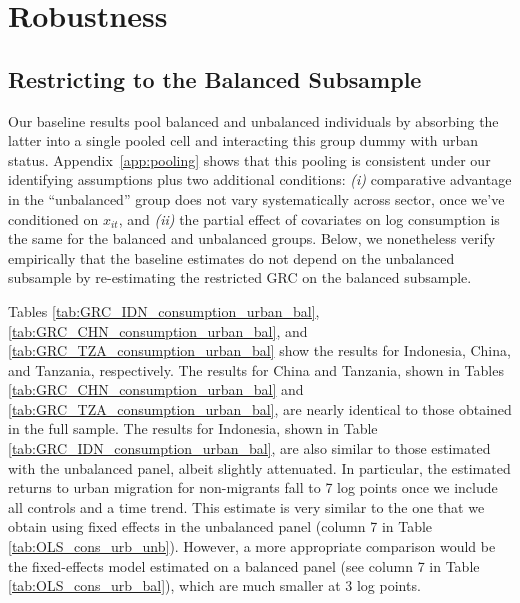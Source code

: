 \section{Robustness}\label{sec:robustness}

\subsection{Restricting to the Balanced Subsample}\label{subsec:balanced}

Our baseline results pool balanced and unbalanced individuals by absorbing the latter into a single pooled cell and interacting this group dummy with urban status.
Appendix~\ref{app:pooling} shows that this pooling is consistent under our identifying assumptions plus two additional conditions: \textit{(i)} comparative advantage in the ``unbalanced'' group does not vary systematically across sector, once we've conditioned on $x_{i t}$, and \textit{(ii)} the partial effect of covariates on log consumption is the same for the balanced and unbalanced groups.
Below, we nonetheless verify empirically that the baseline estimates do not depend on the unbalanced subsample by re-estimating the restricted GRC on the balanced subsample.


Tables \ref{tab:GRC_IDN_consumption_urban_bal}, \ref{tab:GRC_CHN_consumption_urban_bal}, and \ref{tab:GRC_TZA_consumption_urban_bal}  show the results for Indonesia, China, and Tanzania, respectively.
The results for China and Tanzania, shown in Tables \ref{tab:GRC_CHN_consumption_urban_bal} and \ref{tab:GRC_TZA_consumption_urban_bal}, are nearly identical to those obtained in the full sample.
The results for Indonesia, shown in Table \ref{tab:GRC_IDN_consumption_urban_bal}, are also similar to those estimated with the unbalanced panel, albeit slightly attenuated. 
In particular, the estimated returns to urban migration for non-migrants fall to 7 log points once we include all controls and a time trend. 
This estimate is very similar to the one that we obtain using fixed effects in the unbalanced panel (column 7 in Table \ref{tab:OLS_cons_urb_unb}). 
However, a more appropriate comparison would be the fixed-effects model estimated on a balanced panel (see column 7 in Table \ref{tab:OLS_cons_urb_bal}), which are much smaller at 3 log points. 

